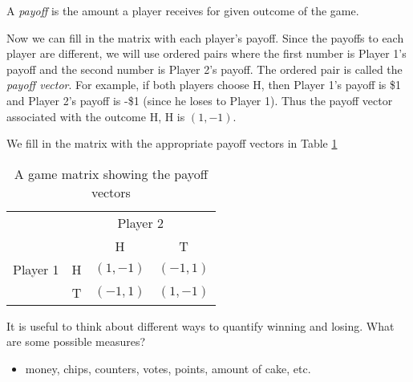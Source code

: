 \begin{example}
\begin{definition} A \emph{payoff} is the amount a player receives for  given outcome of the game.\end{definition}

Now we can fill in the matrix with each player's payoff. Since the payoffs to each player are different, we will use ordered pairs where the first number is Player 1's payoff and the second number is Player 2's payoff. The ordered pair is called the \emph{payoff vector}. For example, if both players choose H, then Player 1's payoff is \$1 and Player 2's payoff is -\$1 (since he loses to Player 1). Thus the payoff vector associated with the outcome H, H is $(1, -1)$. 

We fill in the matrix with the appropriate payoff vectors in Table \ref{T:matchpennies}



\begin{table}[h]
\centering

\begin{tabular}{cccc}
                      & \multicolumn{3}{c}{Player 2}                                                  \\ \cline{2-4} 
\multicolumn{1}{l|}{} & \multicolumn{1}{l|}{} & \multicolumn{1}{c|}{H} & \multicolumn{1}{c|}{T} \\ \cline{2-4} 
\multicolumn{1}{l|}{Player 1} & \multicolumn{1}{c|}{H} & \multicolumn{1}{c|}{$(1, -1)$} & \multicolumn{1}{c|}{$(-1, 1)$} \\ \cline{2-4} 
\multicolumn{1}{l|}{} & \multicolumn{1}{c|}{T} & \multicolumn{1}{c|}{$(-1, 1)$} & \multicolumn{1}{c|}{$(1, -1)$} \\ \cline{2-4} 
\end{tabular}
\caption{A game matrix showing the payoff vectors}
\label{T:matchpennies}
\end{table}
\end{example}



It is useful to think about different ways to quantify winning and losing. What are some possible measures? 
\begin{itemize}
\item money, chips, counters, votes, points, amount of cake, etc.
\end{itemize}

